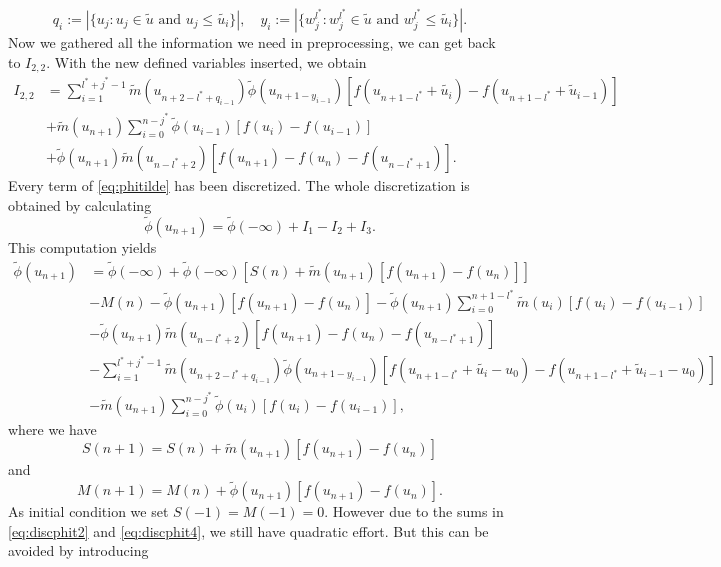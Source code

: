 \documentclass[12pt,a4paper,twoside, open=right]{scrreprt}
\theoremstyle{definition}
\theoremstyle{plain}
\newcommand{\abs}[1]{\left\vert #1\right\vert}
\begin{document}
\begin{equation}
    q_i:=\abs{\{u_j\colon u_j\in\tilde{u} \text{ and }u_j\le\tilde{u_i} \}},\quad
    y_i:=\abs{\{w^{l^*}_j\colon w^{l^*}_j\in\tilde{u} \text{ and }w^{l^*}_j\le\tilde{u_i} \}}.
\end{equation}
Now we gathered all the information we need in preprocessing, we can get back to $I_{2,2}$. With the new defined variables inserted, we obtain
\begin{align}
    I_{2,2}&= \sum_{i=1}^{l^*+j^*-1}\tilde{m}(u_{n+2-l^*+q_{i-1}})\tilde{\phi}(u_{n+1-y_{i-1}})[f(u_{n+1-l^*}+\tilde{u_i})-f(u_{n+1-l^*}+\tilde{u}_{i-1})]\\&+\tilde{m}(u_{n+1})\sum_{i=0}^{n-j^*}\tilde\phi(u_{i-1})[f(u_i)-f(u_{i-1})] \\&+ \tilde\phi(u_{n+1})\tilde{m}(u_{n-l^*+2})[f(u_{n+1})-f(u_n)-f(u_{n-l^*+1})].
\end{align}
Every term of \eqref{eq:phitilde} has been discretized. The whole discretization is obtained by calculating
\begin{equation}
    \tilde\phi(u_{n+1})=\tilde\phi(-\infty) + I_1 -I_2 +I_3.
\end{equation}
This computation yields
\begin{align}
    \tilde\phi(u_{n+1})&=\tilde\phi(-\infty) +\tilde\phi(-\infty)[S(n)+\tilde{m}(u_{n+1})[f(u_{n+1})-f(u_n)]]\label{eq:discphit1}\\&-M(n)\label{eq:discphit2} -\tilde\phi(u_{n+1})[f(u_{n+1})-f(u_{n})]  -\tilde{\phi}(u_{n+1})\sum_{i=0}^{n+1-l^*}\tilde{m}(u_i)[f(u_i)-f(u_{i-1})]\\&- \tilde\phi(u_{n+1})\tilde{m}(u_{n-l^*+2})[f(u_{n+1})-f(u_n)-f(u_{n-l^*+1})] \\&\label{eq:discphit3}-\sum_{i=1}^{l^*+j^*-1}\tilde{m}(u_{n+2-l^*+q_{i-1}})\tilde{\phi}(u_{n+1-y_{i-1}})[f(u_{n+1-l^*}+\tilde{u_i}-u_0)-f(u_{n+1-l^*}+\tilde{u}_{i-1}-u_0)]\\&\label{eq:discphit4}-\tilde{m}(u_{n+1})\sum_{i=0}^{n-j^*}\tilde\phi(u_{i})[f(u_i)-f(u_{i-1})],
\end{align}
where we have
\begin{equation}
    S(n+1) = S(n)+\tilde{m}(u_{n+1})[f(u_{n+1})-f(u_n)]
\end{equation}
and 
\begin{equation}
    M(n+1) = M(n) + \tilde\phi(u_{n+1})[f(u_{n+1})-f(u_{n})].
\end{equation}
As initial condition we set $S(-1)=M(-1)=0$. However due to the sums in \eqref{eq:discphit2} and \eqref{eq:discphit4}, we still have quadratic effort. But this can be avoided by introducing 
\end{document}
